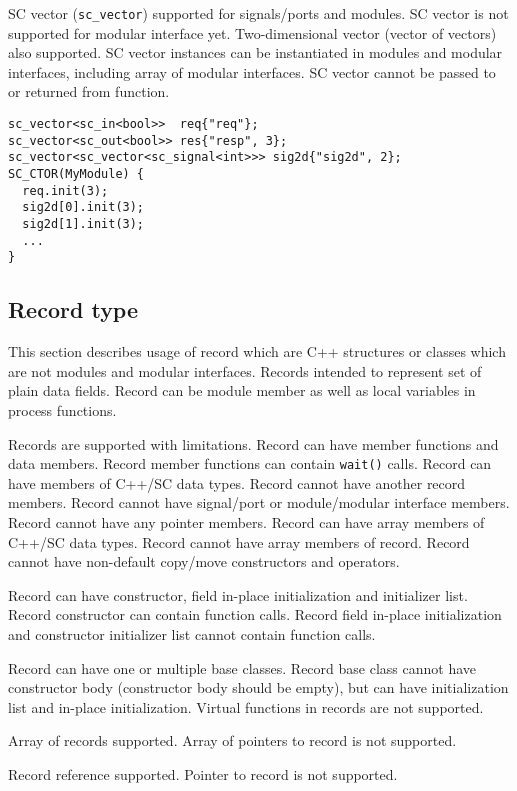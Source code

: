 SC vector ({\tt sc\_vector}) supported for signals/ports and modules. SC vector is not supported for modular interface yet. Two-dimensional vector (vector of vectors) also supported. SC vector instances can be instantiated in modules and modular interfaces, including array of modular interfaces. SC vector cannot be passed to or returned from function.
%
\begin{lstlisting}[style=mycpp]
sc_vector<sc_in<bool>>  req{"req"};
sc_vector<sc_out<bool>> res{"resp", 3};
sc_vector<sc_vector<sc_signal<int>>> sig2d{"sig2d", 2};
SC_CTOR(MyModule) {
  req.init(3);
  sig2d[0].init(3);
  sig2d[1].init(3);        
  ...
}
\end{lstlisting}



\subsection{Record type}

This section describes usage of record which are C++ structures or classes which are not modules and modular interfaces. Records intended to represent set of plain data fields. Record can be module member as well as local variables in process functions. 

Records are supported with limitations. Record can have member functions and data members. Record member functions can contain {\tt wait()} calls. Record can have members of C++/SC data types. Record cannot have another record members. Record cannot have signal/port or module/modular interface members. Record cannot have any pointer members. Record can have array members of C++/SC data types. Record cannot have array members of record. Record cannot have non-default copy/move constructors and operators.

Record can have constructor, field in-place initialization and initializer list. Record constructor can contain function calls. Record field in-place initialization and constructor initializer list cannot contain function calls.

Record can have one or multiple base classes. Record base class cannot have constructor body (constructor body should be empty), but can have initialization list and in-place initialization. Virtual functions in records are not supported.

Array of records supported. Array of pointers to record is not supported. 

Record reference supported. Pointer to record is not supported.

